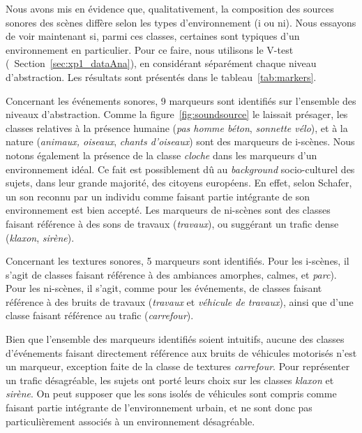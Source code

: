 \documentclass[twoside,twocolumn]{article}
\begin{document}
Nous avons mis en évidence que, qualitativement, la composition des sources sonores des scènes diffère selon les types d'environnement (i ou ni). Nous essayons de voir maintenant si, parmi ces classes, certaines sont typiques d'un environnement en particulier. Pour ce faire, nous utilisons le V-test (\cf~Section~\ref{sec:xp1_dataAna}), en considérant séparément chaque niveau d'abstraction. Les résultats sont présentés dans le tableau~\ref{tab:markers}.

Concernant les événements sonores, 9 marqueurs sont identifiés sur l'ensemble des niveaux d'abstraction. Comme la figure~\ref{fig:soundsource} le laissait présager, les classes relatives à la présence humaine (\emph{pas homme béton}, \emph{sonnette vélo}), et à la nature (\emph{animaux, oiseaux}, \emph{chants d'oiseaux}) sont des marqueurs de i-scènes. Nous notons également la présence de la classe \emph{cloche} dans les marqueurs d'un environnement idéal. Ce fait est possiblement dû au \emph{background} socio-culturel des sujets, dans leur grande majorité, des citoyens européens. En effet, selon Schafer, un son reconnu par un individu comme faisant partie intégrante de son environnement est bien accepté. Les marqueurs de ni-scènes sont des classes faisant référence à des sons de travaux (\emph{travaux}), ou suggérant un trafic dense (\emph{klaxon}, \emph{sirène}).

Concernant les textures sonores, 5 marqueurs sont identifiés. Pour les i-scènes, il s'agit de classes faisant référence à des ambiances amorphes, calmes,   et \emph{parc}). Pour les ni-scènes, il s'agit, comme pour les événements, de classes faisant référence à des bruits de travaux (\emph{travaux} et \emph{véhicule de travaux}), ainsi que d'une classe faisant référence au trafic (\emph{carrefour}).

Bien que l'ensemble des marqueurs identifiés soient intuitifs, aucune des classes d'événements faisant directement référence aux bruits de véhicules motorisés n'est un marqueur, exception faite de la classe de textures \emph{carrefour}. Pour représenter un trafic désagréable, les sujets ont porté leurs choix sur les classes \emph{klaxon} et \emph{sirène}. On peut supposer que les sons isolés de véhicules sont compris comme faisant partie intégrante de l'environnement urbain, et ne sont donc pas particulièrement associés à un environnement désagréable. 
\end{document}
